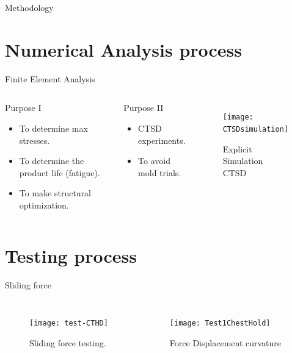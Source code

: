 \documentclass[10pt]{beamer} %
\begin{document}
\begin{frame}[fragile]{Methodology}
\begin{center}
\end{center}
\end{frame}
\section{Numerical Analysis process}
\begin{frame}[fragile]{Finite Element Analysis}
\begin{columns}[T,onlytextwidth]
	\begin{block}{Purpose I}
	\begin{itemize}
		\item {To determine max stresses.}
		\item {To determine the product life (fatigue).}
		\item {To make structural optimization.}
	\end{itemize}
	\end{block}
	\begin{block}{Purpose II}
	\begin{itemize}
		\item {CTSD experiments.}
		\item {To avoid mold trials.}
	\end{itemize}
	\end{block}
	\begin{figure}
	\vspace{1cm}
	\texttt{[image: CTSDsimulation]}
	\caption{Explicit Simulation CTSD}
	\end{figure}
\end{columns}
\end{frame}

\section{Testing process}

\begin{frame}[fragile]{Sliding force}
\begin{columns}[T,onlytextwidth]
	\begin{figure}
	\vspace{1cm}
	\texttt{[image: test-CTHD]}
	\caption{Sliding force testing.}
	\end{figure}
	\begin{figure}
	\vspace{1cm}
	\texttt{[image: Test1ChestHold]}
	\caption{Force Displacement curvature}
	\end{figure}
\end{columns}
\end{frame}
\end{document}
